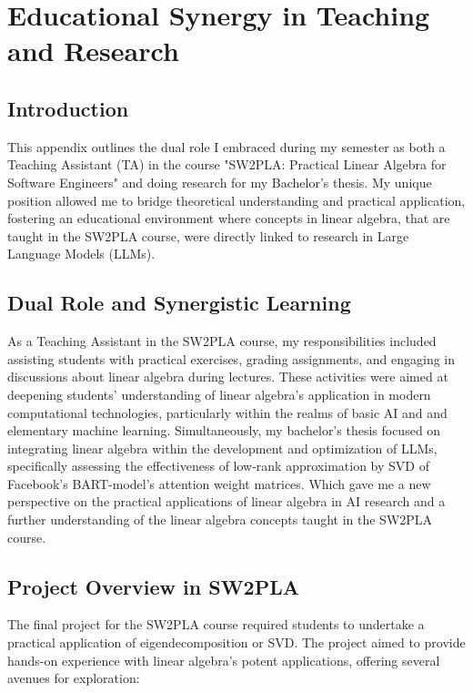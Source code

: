 \chapter{Educational Synergy in Teaching and Research}
\section*{Introduction}

This appendix outlines the dual role I embraced during my semester as both a Teaching Assistant (TA) in the course "SW2PLA: Practical Linear Algebra for Software Engineers" and doing research for my Bachelor's thesis. My unique position allowed me to bridge theoretical understanding and practical application, fostering an educational environment where concepts in linear algebra, that are taught in the SW2PLA course, were directly linked to research in Large Language Models (LLMs).

\section*{Dual Role and Synergistic Learning}

As a Teaching Assistant in the SW2PLA course, my responsibilities included assisting students with practical exercises, grading assignments, and engaging in discussions about linear algebra during lectures. These activities were aimed at deepening students' understanding of linear algebra's application in modern computational technologies, particularly within the realms of basic AI and and elementary machine learning.
Simultaneously, my bachelor's thesis focused on integrating linear algebra within the development and optimization of LLMs, specifically assessing the effectiveness of low-rank approximation by SVD of Facebook's BART-model's attention weight matrices. Which gave me a new perspective on the practical applications of linear algebra in AI research and a further understanding of the linear algebra concepts taught in the SW2PLA course.

\section*{Project Overview in SW2PLA}

The final project for the SW2PLA course required students to undertake a practical application of eigendecomposition or SVD. The project aimed to provide hands-on experience with linear algebra's potent applications, offering several avenues for exploration:

